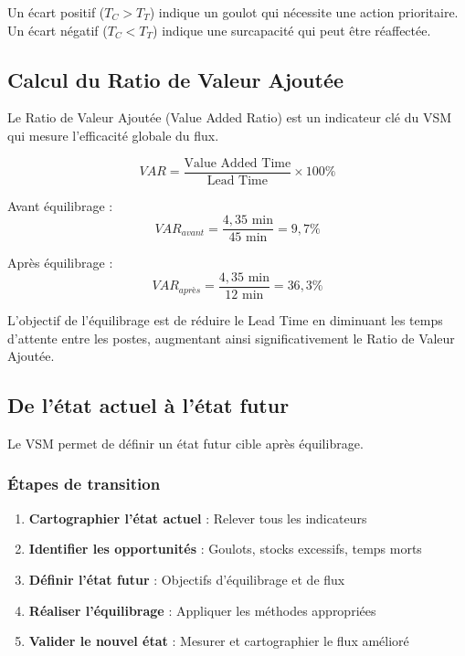 \documentclass[12pt,a4paper]{article}
\newenvironment{importantnote}
  {\begin{tcolorbox}[colback=blue!5!white, colframe=blue!50!black, title=\textbf{Point Important}]\small}
  {\end{tcolorbox}}
\newenvironment{conseil}
  {\begin{tcolorbox}[colback=green!5!white, colframe=green!50!black, title=\textbf{Conseil}]\small}
  {\end{tcolorbox}}
\begin{document}
\begin{importantnote}
Un écart positif ($T_C > T_T$) indique un goulot qui nécessite une action prioritaire. Un écart négatif ($T_C < T_T$) indique une surcapacité qui peut être réaffectée.
\end{importantnote}

\subsection{Calcul du Ratio de Valeur Ajoutée}

Le Ratio de Valeur Ajoutée (Value Added Ratio) est un indicateur clé du VSM qui mesure l'efficacité globale du flux.

\[
\boxed{VAR = \frac{\text{Value Added Time}}{\text{Lead Time}} \times 100\%}
\]

Avant équilibrage :
\[
VAR_{avant} = \frac{4,35 \text{ min}}{45 \text{ min}} = 9,7\%
\]

Après équilibrage :
\[
VAR_{après} = \frac{4,35 \text{ min}}{12 \text{ min}} = 36,3\%
\]

\begin{conseil}
L'objectif de l'équilibrage est de réduire le Lead Time en diminuant les temps d'attente entre les postes, augmentant ainsi significativement le Ratio de Valeur Ajoutée.
\end{conseil}

\subsection{De l'état actuel à l'état futur}

Le VSM permet de définir un état futur cible après équilibrage.

\subsubsection{Étapes de transition}

\begin{enumerate}
    \item \textbf{Cartographier l'état actuel} : Relever tous les indicateurs
    \item \textbf{Identifier les opportunités} : Goulots, stocks excessifs, temps morts
    \item \textbf{Définir l'état futur} : Objectifs d'équilibrage et de flux
    \item \textbf{Réaliser l'équilibrage} : Appliquer les méthodes appropriées
    \item \textbf{Valider le nouvel état} : Mesurer et cartographier le flux amélioré
\end{enumerate}
\end{document}
